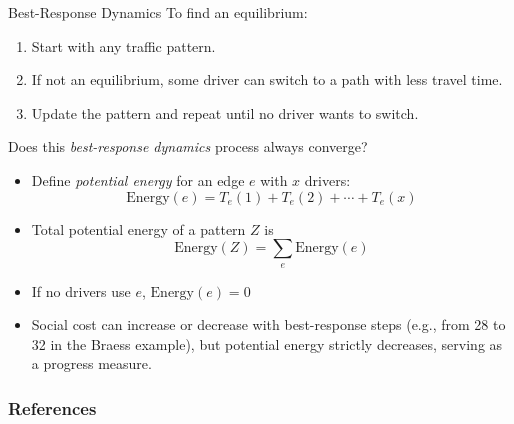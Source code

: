 \documentclass[10pt]{beamer}
\begin{document}
\begin{frame}{Best-Response Dynamics}
  \onslide<+->
  To find an equilibrium:
  \begin{enumerate}[<+->]
    \item Start with any traffic pattern.
    \item If not an equilibrium, some driver can switch to a path with less travel time.
    \item Update the pattern and repeat until no driver wants to switch.
  \end{enumerate}
  \onslide<+->
  Does this \emph{best-response dynamics} process always converge?
  \vspace{3mm}
  \begin{itemize}[<+->]
    \item Define \emph{potential energy} for an edge \( e \) with \( x \) drivers:
      \[\text{Energy}(e) = T_e(1) + T_e(2) + \cdots + T_e(x)\]
    \item Total potential energy of a pattern \( Z \) is
      \[\text{Energy}(Z) = \sum_{e} \text{Energy}(e)\]
    \item If no drivers use \( e \), \( \text{Energy}(e) = 0 \)
    \item Social cost can increase or decrease with best-response steps (e.g., from 28 to 32 in the Braess example), but potential energy strictly decreases, serving as a progress measure.
  \end{itemize}
\end{frame}

\begin{frame}%
  \frametitle{References}
  \nocite{*}
  
  
\end{frame}
\end{document}
